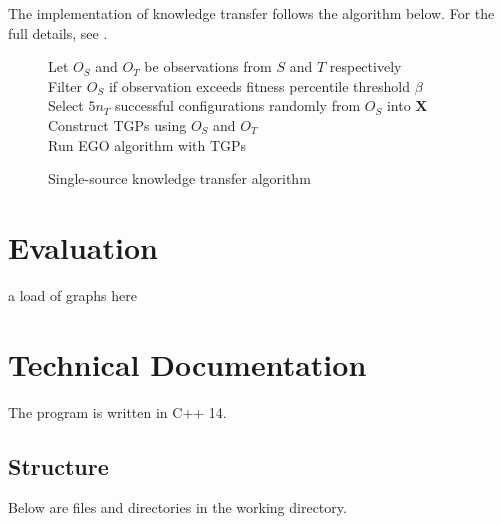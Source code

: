 \documentclass[10pt,a4paper]{article}
\begin{document}
The implementation of knowledge transfer follows the algorithm below. For the full details, see .
\begin{figure}[H]
	\begin{framed}
		\begin{algorithm}[H]
			Let $O_S$ and $O_T$ be observations from $S$ and $T$ respectively\\
			Filter $O_S$ if observation exceeds fitness percentile threshold $\beta$\\
			Select $5n_T$ successful configurations randomly from $O_S$ into $\mathbf{X}$\\
			Construct TGPs using $O_S$ and $O_T$\\
			Run EGO algorithm with TGPs
		\end{algorithm}		
	\end{framed}
	\caption{Single-source knowledge transfer algorithm}
\end{figure}

\section{Evaluation}

a load of graphs here

\section{Technical Documentation}

The program is written in C++ 14.

\subsection{Structure}

Below are files and directories in the working directory. 
\end{document}
